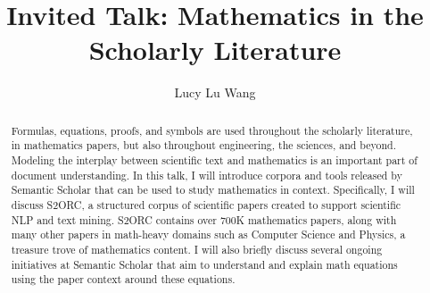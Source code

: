 \documentclass[a4paper]{easychair}%
\title{Invited Talk: Mathematics in the Scholarly Literature}
\author{Lucy Lu Wang}
\institute{Allen Institute for AI}
\begin{document}
\maketitle
\begin{abstract}
  Formulas, equations, proofs, and symbols are used throughout the scholarly literature, in mathematics papers, but also throughout engineering, the sciences, and beyond. Modeling the interplay between scientific text and mathematics is an important part of document understanding. In this talk, I will introduce corpora and tools released by Semantic Scholar that can be used to study mathematics in context. Specifically, I will discuss S2ORC, a structured corpus of scientific papers created to support scientific NLP and text mining. S2ORC contains over 700K mathematics papers, along with many other papers in math-heavy domains such as Computer Science and Physics, a treasure trove of mathematics content. I will also briefly discuss several ongoing initiatives at Semantic Scholar that aim to understand and explain math equations using the paper context around these equations.
\end{abstract}
\end{document}
